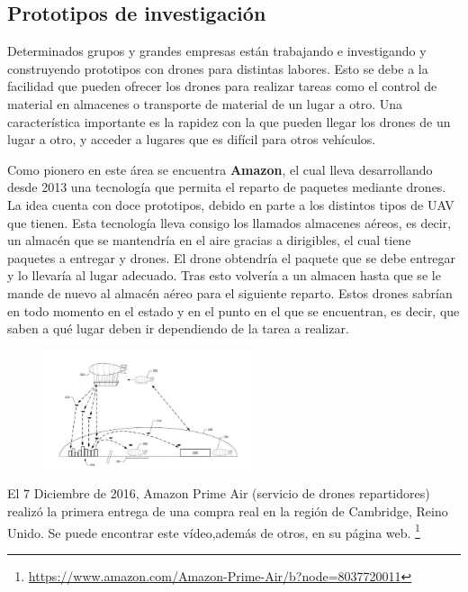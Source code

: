 
\subsection{Prototipos de investigaci\'on }
\hspace{1 cm} Determinados grupos y grandes empresas est\'an trabajando e investigando y construyendo prototipos con drones para distintas labores. Esto se debe a la facilidad que pueden ofrecer los drones para realizar tareas como el control de material en almacenes o transporte de material de un lugar a otro. Una caracter\'istica importante es la rapidez con la que pueden llegar los drones de un lugar a otro, y acceder a lugares que es dif\'icil para otros veh\'iculos. 


\hspace{1 cm} Como pionero en este \'area se encuentra \textbf{Amazon}, el cual lleva desarrollando desde 2013 una tecnolog\'ia que permita el reparto de paquetes mediante drones. La idea cuenta con doce prototipos, debido en parte a los distintos tipos de UAV que tienen.  Esta tecnolog\'ia lleva consigo los llamados almacenes a\'ereos, es decir, un almac\'en que se mantendr\'ia en el aire gracias a dirigibles, el cual tiene paquetes a entregar y drones. El drone obtendr\'ia el paquete que se debe entregar y lo llevar\'ia al lugar adecuado. Tras esto volver\'ia a un almacen hasta que se le mande de nuevo al almac\'en a\'ereo para el siguiente reparto. Estos drones sabr\'ian en todo momento en el estado y en el punto en el que se encuentran, es decir, que saben a qu\'e lugar deben ir dependiendo de la tarea a realizar. 

\begin{figure}[ht]
	\centering
		\includegraphics[width=0.55\textwidth]{imgs/amazon.jpg}
	\label{fig:Esquema de reparto con drones}
\end{figure}

\hspace{1 cm} El 7 Diciembre de 2016, Amazon Prime Air (servicio de drones repartidores) realiz\'o la primera entrega de una compra real en la regi\'on de Cambridge, Reino Unido. Se puede encontrar este v\'ideo,adem\'as de otros, en su p\'agina web. \footnote{\url{https://www.amazon.com/Amazon-Prime-Air/b?node=8037720011}}

